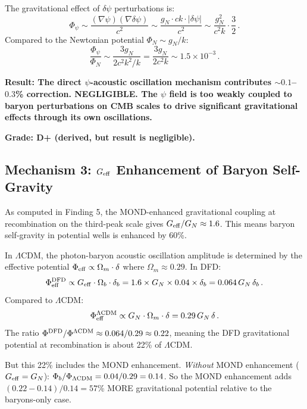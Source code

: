 \documentclass[11pt]{article}
\newcommand{\ee}[1]{\times 10^{#1}}
\newcommand{\dpsi}{\delta\psi}
\newcommand{\LCDM}{$\Lambda$CDM}
\newcommand{\Geff}{G_{\rm eff}}
\newcommand{\Ob}{\Omega_b}
\newcommand{\Om}{\Omega_m}
\begin{document}
The gravitational effect of $\dpsi$ perturbations is:
\begin{equation}
\Phi_\psi \sim \frac{(\nabla\psi)(\nabla\dpsi)}{c^2}
\sim \frac{g_N\cdot c k\cdot|\dpsi|}{c^2}
\sim \frac{g_N^2}{c^2 k}\cdot\frac{3}{2}\,.
\end{equation}
Compared to the Newtonian potential $\Phi_N \sim g_N/k$:
\begin{equation}
\frac{\Phi_\psi}{\Phi_N} \sim \frac{3 g_N}{2 c^2 k^2/k}
= \frac{3 g_N}{2 c^2 k} \sim 1.5\ee{-3}\,.
\end{equation}

\textbf{Result: The direct $\psi$-acoustic oscillation mechanism
contributes $\sim 0.1$--$0.3$\% correction.  NEGLIGIBLE.  The $\psi$ field
is too weakly coupled to baryon perturbations on CMB scales to drive
significant gravitational effects through its own oscillations.}

\textbf{Grade: D+ (derived, but result is negligible).}

\subsection{Mechanism 3: $\Geff$ Enhancement of Baryon Self-Gravity}

As computed in Finding 5, the MOND-enhanced gravitational coupling
at recombination on the third-peak scale gives $\Geff/G_N \approx 1.6$.
This means baryon self-gravity in potential wells is enhanced by 60\%.

In \LCDM, the photon-baryon acoustic oscillation amplitude is determined
by the effective potential $\Phi_{\rm eff} \propto \Om\cdot\delta$ where
$\Om \approx 0.29$.  In DFD:
\begin{equation}
\Phi_{\rm eff}^{\rm DFD} \propto \Geff\cdot\Ob\cdot\delta_b
= 1.6 \times G_N \times 0.04 \times \delta_b
= 0.064\,G_N\,\delta_b\,.
\end{equation}
Compared to \LCDM:
\begin{equation}
\Phi_{\rm eff}^{\Lambda\rm CDM} \propto G_N\cdot\Om\cdot\delta
= 0.29\,G_N\,\delta\,.
\end{equation}
The ratio $\Phi^{\rm DFD}/\Phi^{\Lambda\rm CDM} \approx 0.064/0.29
\approx 0.22$, meaning the DFD gravitational potential at recombination
is about 22\% of \LCDM.

But this 22\% includes the MOND enhancement.  \emph{Without} MOND
enhancement ($\Geff = G_N$): $\Phi_b/\Phi_{\Lambda\rm CDM} = 0.04/0.29
= 0.14$.  So the MOND enhancement adds $(0.22 - 0.14)/0.14 = 57$\%
MORE gravitational potential relative to the baryons-only case.
\end{document}
